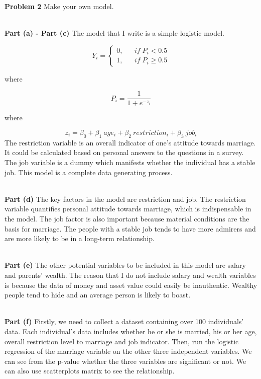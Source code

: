 \documentclass[letterpaper,12pt]{article}
\theoremstyle{definition}
\begin{document}
\newpage
\noindent\textbf{Problem 2}
Make your own model.

~\\
\noindent\textbf{Part (a) - Part (c)}
The model that I write is a simple logistic model.

\begin{equation*}
Y_{i}=\left\{
\begin{array}{rcl}
0,       &      & {if\; P_{i}    <    0.5}\\
1,     &      & {if\; P_{i}  \geq   0.5}
\end{array} \right.
\end{equation*}

where

\begin{equation*}
P_{i} = \frac{1}{1+e^{-z_{i}}}
\end{equation*}

where

\begin{equation*}
z_{i} = \beta_{0}+\beta_{1}\ age_{i}+ \beta_{2}\ restriction_{i}+\beta_{3}\ job_{i}
\end{equation*}
The restriction variable is an overall indicator of one's attitude towards marriage. It could be calculated based on personal answers to the questions in a survey. The job variable is a dummy which manifests whether the individual has a stable job. This model is a complete data generating process.

~\\
\noindent\textbf{Part (d)}
The key factors in the model are restriction and job. The restriction variable quantifies personal attitude towards marriage, which is indispensable in the model. The job factor is also important because material conditions are the basis for marriage. The people with a stable job tends to have more admirers and are more likely to be in a long-term relationship.

~\\
\noindent\textbf{Part (e)}
The other potential variables to be included in this model are salary and parents' wealth. The reason that I do not include salary and wealth variables is because the data of money and asset value could easily be inauthentic. Wealthy people tend to hide and an average person is likely to boast.

~\\
\noindent\textbf{Part (f)}
Firstly, we need to collect a dataset containing over 100 individuals' data. Each individual's data includes whether he or she is married, his or her age, overall restriction level to marriage and job indicator. Then, run the logistic regression of the marriage variable on the other three independent variables. We can see from the p-value whether the three variables are significant or not. We can also use scatterplots matrix to see the relationship. 
\end{document}
